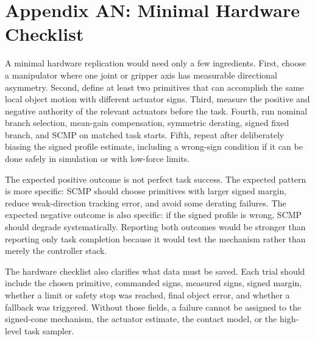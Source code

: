 \documentclass{article}
\begin{document}
\section*{Appendix AN: Minimal Hardware Checklist}

A minimal hardware replication would need only a few ingredients. First, choose a manipulator where one joint or gripper axis has measurable directional asymmetry. Second, define at least two primitives that can accomplish the same local object motion with different actuator signs. Third, measure the positive and negative authority of the relevant actuators before the task. Fourth, run nominal branch selection, mean-gain compensation, symmetric derating, signed fixed branch, and SCMP on matched task starts. Fifth, repeat after deliberately biasing the signed profile estimate, including a wrong-sign condition if it can be done safely in simulation or with low-force limits.

The expected positive outcome is not perfect task success. The expected pattern is more specific: SCMP should choose primitives with larger signed margin, reduce weak-direction tracking error, and avoid some derating failures. The expected negative outcome is also specific: if the signed profile is wrong, SCMP should degrade systematically. Reporting both outcomes would be stronger than reporting only task completion because it would test the mechanism rather than merely the controller stack.

The hardware checklist also clarifies what data must be saved. Each trial should include the chosen primitive, commanded signs, measured signs, signed margin, whether a limit or safety stop was reached, final object error, and whether a fallback was triggered. Without those fields, a failure cannot be assigned to the signed-cone mechanism, the actuator estimate, the contact model, or the high-level task sampler.
\end{document}
